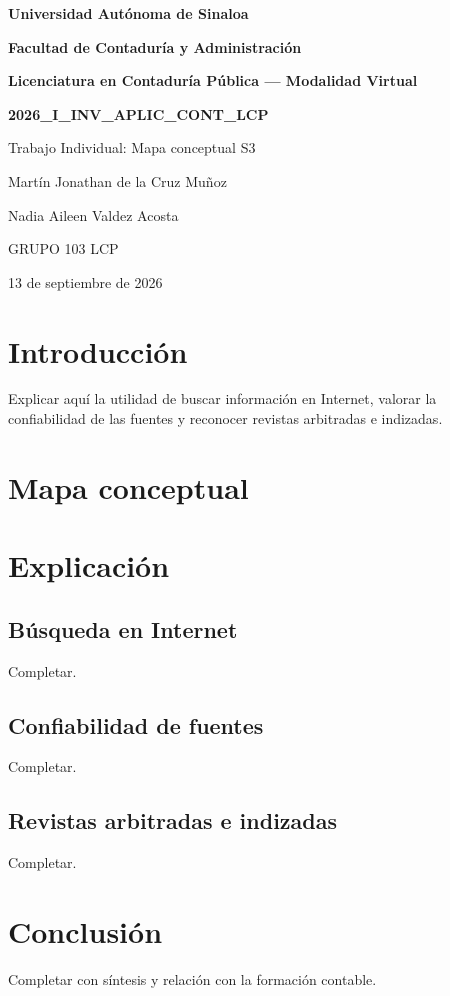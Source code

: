 \documentclass[12pt,letterpaper,oneside]{article}
\begin{document}
\begin{center}
{\bfseries Universidad Autónoma de Sinaloa}\par
{\bfseries Facultad de Contaduría y Administración}\par
{\bfseries Licenciatura en Contaduría Pública — Modalidad Virtual}\par
\vspace{.5cm}
{\Large\bfseries 2026_I_INV_APLIC_CONT_LCP}\par
{\large Trabajo Individual: Mapa conceptual S3}\par
\vspace{.5cm}
Martín Jonathan de la Cruz Muñoz\par
Nadia Aileen Valdez Acosta\par
GRUPO 103 LCP\par
13 de septiembre de 2026
\end{center}

\section{Introducción}
Explicar aquí la utilidad de buscar información en Internet, valorar la confiabilidad de las fuentes y reconocer revistas arbitradas e indizadas.

\section{Mapa conceptual}

\section{Explicación}
\subsection{Búsqueda en Internet}
Completar.

\subsection{Confiabilidad de fuentes}
Completar.

\subsection{Revistas arbitradas e indizadas}
Completar.

\section{Conclusión}
Completar con síntesis y relación con la formación contable.



\end{document}
